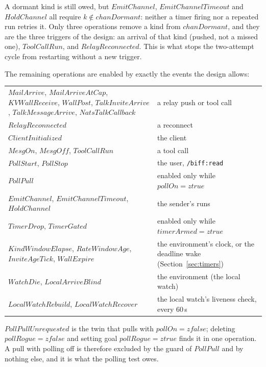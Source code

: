 \documentclass[a4paper,10pt,fleqn]{article}
\begin{document}
A dormant kind is still owed, but $EmitChannel$, $EmitChannelTimeout$ and
$HoldChannel$ all require $k \notin chanDormant$: neither a timer firing nor
a repeated run retries it.  Only three operations remove a kind from
$chanDormant$, and they are the three triggers of the design: an arrival of
that kind (pushed, not a missed one), $ToolCallRun$, and $RelayReconnected$.
This is what stops the two-attempt cycle from restarting without a new
trigger.

The remaining operations are enabled by exactly the events the design
allows:
\begin{center}
\begin{tabular}{ll}
  $MailArrive$, $MailArriveAtCap$, $KVWallReceive$, $WallPost$,
    $TalkInviteArrive$, $TalkMessageArrive$, $NatsTalkCallback$ &
    a relay push or tool call \\
  $RelayReconnected$ & a reconnect \\
  $ClientInitialized$ & the client \\
  $MesgOn$, $MesgOff$, $ToolCallRun$ & a tool call \\
  $PollStart$, $PollStop$ & the user, \texttt{/biff:read} \\
  $PollPull$ & enabled only while $pollOn = ztrue$ \\
  $EmitChannel$, $EmitChannelTimeout$, $HoldChannel$ & the sender's runs \\
  $TimerDrop$, $TimerGated$ & enabled only while $timerArmed = ztrue$ \\
  $KindWindowElapse$, $RateWindowAge$, $InviteAgeTick$, $WallExpire$ &
    the environment's clock, or the deadline wake (Section~\ref{sec:timers}) \\
  $WatchDie$, $LocalArriveBlind$ & the environment (the local watch) \\
  $LocalWatchRebuild$, $LocalWatchRecover$ &
    the local watch's liveness check, every 60\,s \\
\end{tabular}
\end{center}
$PollPullUnrequested$ is the twin that pulls with $pollOn = zfalse$;
deleting $pollRogue = zfalse$ and setting goal $pollRogue = ztrue$ finds it
in one operation.  A pull with polling off is therefore excluded by the guard
of $PollPull$ and by nothing else, and it is what the polling test owes.
\end{document}
